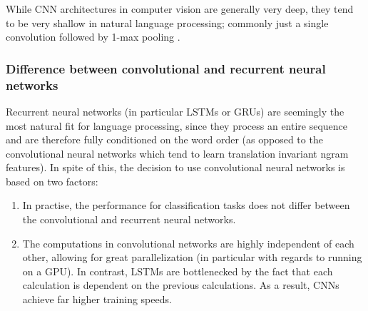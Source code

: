 While CNN architectures in computer vision are generally very deep, they tend to
be very shallow in natural language processing; commonly just a single
convolution followed by 1-max pooling \citep{zhang2015conv}.

\subsubsection{Difference between convolutional and recurrent neural networks}
Recurrent neural networks (in particular LSTMs or GRUs) are seemingly the most
natural fit for language processing, since they process an entire sequence and
are therefore fully conditioned on the word order (as opposed to the
convolutional neural networks which tend to learn translation invariant ngram
features). In spite of this, the decision to use convolutional neural networks
is based on two factors:
\begin{enumerate}
\item In practise, the performance for classification tasks does not differ
  between the convolutional and recurrent neural networks.\citep{cnnrnn}
\item The computations in convolutional networks are highly independent of
  each other, allowing for great parallelization (in particular with regards to
  running on a GPU). In contrast, LSTMs are bottlenecked by the fact that each
  calculation is dependent on the previous calculations. As a result, CNNs
  achieve far higher training speeds.\citep{facebook}
\end{enumerate}

